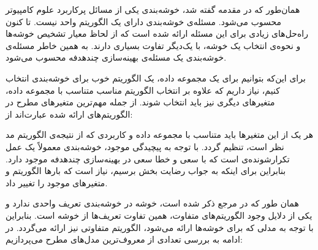 
همان‌طور که در مقدمه گفته شد، خوشه‌بندی یکی از مسائل پرکاربرد علوم کامپیوتر محسوب می‌شود.
مسئله‌ی خوشه‌بندی دارای یک الگوریتم واحد نیست.
تا کنون راه‌حل‌های زیادی برای این مسئله ارائه شده است که از لحاظ معیار تشخیص خوشه‌ها و نحوه‌ی انتخاب یک خوشه، با یک‌دیگر تفاوت بسیاری دارند.
به همین خاطر مسئله‌ی خوشه‌بندی یک مسئله‌ی بهینه‌سازی چندهدفه محسوب می‌شود.

برای این‌که بتوانیم برای یک مجموعه داده، یک الگوریتم خوب برای خوشه‌بندی انتخاب کنیم، نیاز داریم که علاوه بر انتخاب الگوریتم مناسب متناسب با مجموعه داده، متغیرهای دیگری نیز باید انتخاب شوند.
از جمله مهم‌ترین متغیرهای مطرح در الگوریتم‌های ارائه شده عبارت‌اند از:






هر یک از این متغیرها باید متناسب با مجموعه داده و کاربردی که از نتیجه‌ی الگوریتم مد نظر است، تنظیم گردد.
با توجه به پیچیدگی موجود، خوشه‌بندی معمولاً یک عمل تکرارشونده‌ی است که با سعی و خطا سعی در بهینه‌سازی چندهدفه موجود دارد.
بنابراین برای اینکه به جواب رضایت بخش برسیم، نیاز است که بارها الگوریتم و متغیرهای موجود را تغییر داد.

همان طور که در مرجع  ذکر شده است، خوشه در خوشه‌بندی تعریف واحدی ندارد و یکی از دلایل وجود الگوریتم‌های متفاوت، همین تفاوت تعریف‌ها از خوشه است.
بنابراین با توجه به مدلی که برای خوشه‌ها ارائه می‌شود، الگوریتم متفاوتی نیز ارائه می‌گردد.
در ادامه به بررسی تعدادی از معروف‌ترین مدل‌های مطرح می‌پردازیم:





